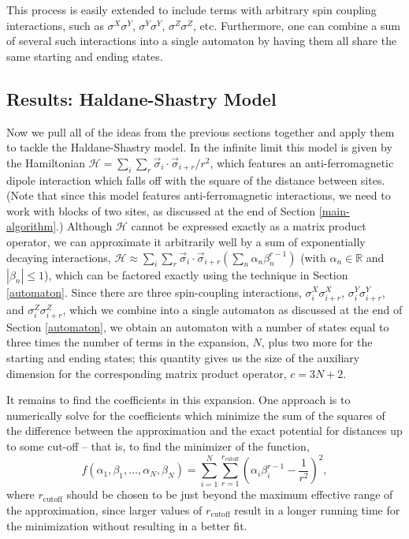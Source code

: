 \documentclass[12pt]{amsbook}
\theoremstyle{plain}
\theoremstyle{definition}
\theoremstyle{remark}
\newcommand{\paren}[1]{\left(#1\right)}
\begin{document}
This process is easily extended to include terms with arbitrary spin coupling interactions, such as $\sigma^X\sigma^Y$, $\sigma^Y\sigma^Y$, $\sigma^Z\sigma^Z$, etc.  Furthermore, one can combine a sum of several such interactions into a single automaton by having them all share the same starting and ending states. 
\subsection{Results:  Haldane-Shastry Model}

Now we pull all of the ideas from the previous sections together and apply them to tackle the Haldane-Shastry model.\cite{PhysRevLett.60.635,PhysRevLett.60.639}  In the infinite limit this model is given by the Hamiltonian $\mathcal{H} = \sum_i \sum_r \vec{\sigma}_i\cdot\vec{\sigma}_{i+r}/r^2$,  which features an anti-ferromagnetic dipole interaction which falls off with the square of the distance between sites.  (Note that since this model features anti-ferromagnetic interactions, we need to work with blocks of two sites, as discussed at the end of Section \ref{main-algorithm}.)  Although $\mathcal{H}$ cannot be expressed exactly as a matrix product operator, we can approximate it arbitrarily well by a sum of exponentially decaying interactions, $\mathcal{H}\approx  \sum_i \sum_r \vec{\sigma}_i\cdot\vec{\sigma}_{i+r}\paren{\sum_n \alpha_n \beta_n^{r-1}}$ (with $\alpha_n\in\mathbb{R}$ and $|\beta_n| \le 1$), which can be factored exactly using the technique in Section \ref{automaton}.  Since there are three spin-coupling interactions, $\sigma^X_i\sigma^X_{i+r}$, $\sigma^Y_i\sigma^Y_{i+r}$, and $\sigma^Z_i\sigma^Z_{i+r}$, which we combine into a single automaton as discussed at the end of Section \ref{automaton}, we obtain an automaton with a number of states equal to three times the number of terms in the expansion, $N$, plus two more for the starting and ending states;  this quantity gives us the size of the auxiliary dimension for the corresponding matrix product operator, $c=3N+2$.

It remains to find the coefficients in this expansion.  One approach is to numerically solve for the coefficients which minimize the sum of the squares of the difference between the approximation and the exact potential for distances up to some cut-off -- that is, to find the minimizer of the function,
$$f(\alpha_1,\beta_1,\dots,\alpha_N,\beta_N) = \sum_{i=1}^N \sum_{r=1}^{r_{\text{cutoff}}} \paren{\alpha_i \beta_i^{r-1} - \frac{1}{r^2}}^2,$$
where $r_{\text{cutoff}}$ should be chosen to be just beyond the maximum effective range of the approximation, since larger values of $r_{\text{cutoff}}$ result in a longer running time for the minimization without resulting in a better fit.
\end{document}
